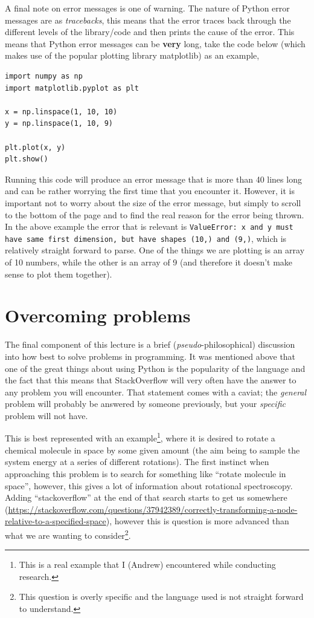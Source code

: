 \documentclass[a4paper]{article}
\begin{document}
A final note on error messages is one of warning.
The nature of Python error messages are as \emph{tracebacks}, this means that the error traces back through the different levels of the library/code and then prints the cause of the error.
This means that Python error messages can be \textbf{very} long, take the code below (which makes use of the popular plotting library matplotlib) as an example,
\begin{lstlisting}
import numpy as np
import matplotlib.pyplot as plt

x = np.linspace(1, 10, 10)
y = np.linspace(1, 10, 9)

plt.plot(x, y)
plt.show()
\end{lstlisting}
Running this code will produce an error message that is more than 40 lines long and can be rather worrying the first time that you encounter it.
However, it is important not to worry about the size of the error message, but simply to scroll to the bottom of the page and to find the real reason for the error being thrown.
In the above example the error that is relevant is \texttt{ValueError: x and y must have same first dimension, but have shapes (10,) and (9,)}, which is relatively straight forward to parse.
One of the things we are plotting is an array of 10 numbers, while the other is an array of 9 (and therefore it doesn't make sense to plot them together).

\section{Overcoming problems}
The final component of this lecture is a brief (\emph{pseudo}-philosophical) discussion into how best to solve problems in programming.
It was mentioned above that one of the great things about using Python is the popularity of the language and the fact that this means that StackOverflow will very often have the answer to any problem you will encounter.
That statement comes with a caviat; the \emph{general} problem will probably be answered by someone previously, but your \emph{specific} problem will not have.

This is best represented with an example\footnote{This is a real example that I (Andrew) encountered while conducting research.}, where it is desired to rotate a chemical molecule in space by some given amount (the aim being to sample the system energy at a series of different rotations).
The first instinct when approaching this problem is to search for something like ``rotate molecule in space'', however, this gives a lot of information about rotational spectroscopy.
Adding ``stackoverflow'' at the end of that search starts to get us somewhere (\url{https://stackoverflow.com/questions/37942389/correctly-transforming-a-node-relative-to-a-specified-space}), however this is question is more advanced than what we are wanting to consider\footnote{This question is overly specific and the language used is not straight forward to understand.}.
\end{document}
